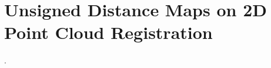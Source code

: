 \chapter{Unsigned Distance Maps on 2D Point Cloud Registration}\label{appx:dmaps}
\begin{description}[leftmargin=1cm,style=nextline,font=\normalfont]
\item[\cite{sousa:robot:2026}] .
\end{description}

\cleardoublepage



